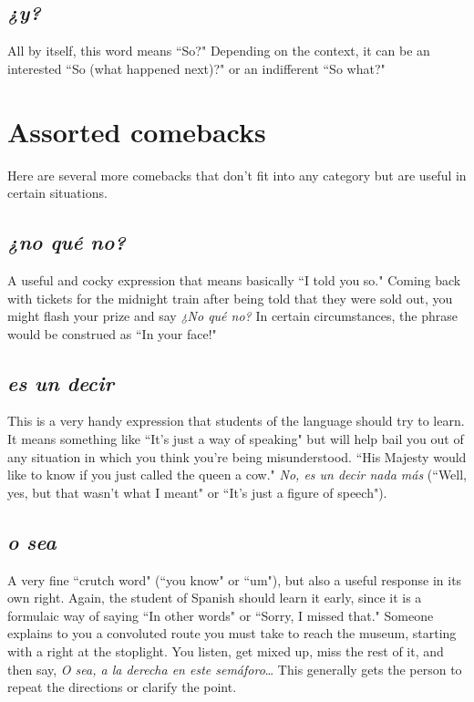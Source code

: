 \subsection{\emph{¿y?}}

All by itself, this word means ``So?" Depending on the context,
it can be an interested ``So (what happened next)?" or an indifferent
``So what?"

\section{Assorted comebacks}

Here are several more comebacks that don't fit into any category but are useful in certain situations.

\subsection{\emph{¿no qué no?}}

A useful and cocky expression that means basically ``I told you
so." Coming back with tickets for the midnight train after being told
that they were sold out, you might flash your prize and say \emph{¿No qué
no?} In certain circumstances, the phrase would be construed as ``In
your face!"

\subsection{\emph{es un decir}}

This is a very handy expression that students of the language
should try to learn. It means something like ``It's just a way of speaking" but will help bail you out of any situation in which you think
you're being misunderstood. ``His Majesty would like to know if you
just called the queen a cow." \emph{No, es un decir nada más} (``Well, yes, but
that wasn't what I meant" or ``It's just a figure of speech").

\subsection{\emph{o sea}}

A very fine ``crutch word" (``you know" or ``um"), but also a
useful response in its own right. Again, the student of Spanish should
learn it early, since it is a formulaic way of saying ``In other words" or
``Sorry, I missed that." Someone explains to you a convoluted route
you must take to reach the museum, starting with a right at the stoplight. You listen, get mixed up, miss the rest of it, and then say, \emph{O sea,
a la derecha en este semáforo}\ldots{} This generally gets the person to
repeat the directions or clarify the point.


